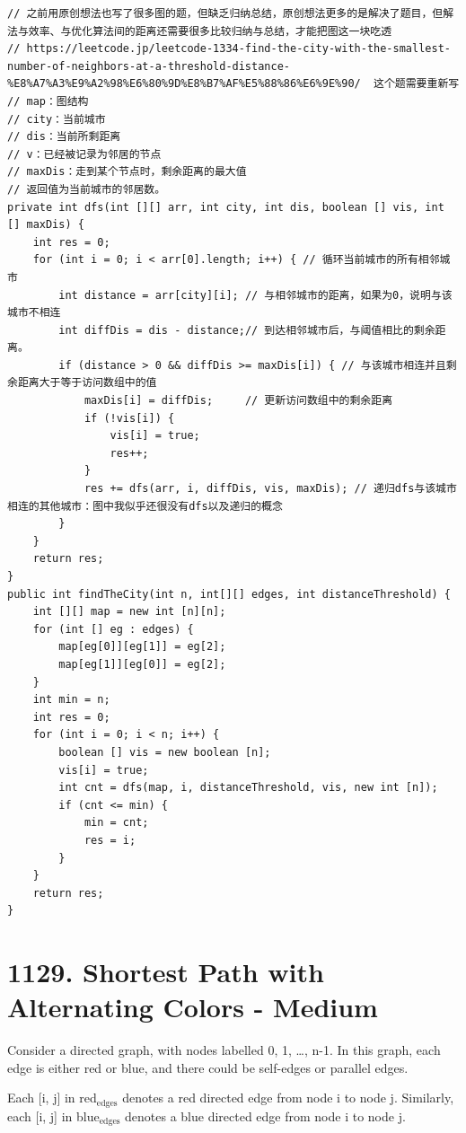 \documentclass[9pt, b5paaper]{book}
\begin{document}
\begin{verbatim}
// 之前用原创想法也写了很多图的题，但缺乏归纳总结，原创想法更多的是解决了题目，但解法与效率、与优化算法间的距离还需要很多比较归纳与总结，才能把图这一块吃透
// https://leetcode.jp/leetcode-1334-find-the-city-with-the-smallest-number-of-neighbors-at-a-threshold-distance-%E8%A7%A3%E9%A2%98%E6%80%9D%E8%B7%AF%E5%88%86%E6%9E%90/  这个题需要重新写
// map：图结构
// city：当前城市
// dis：当前所剩距离
// v：已经被记录为邻居的节点
// maxDis：走到某个节点时，剩余距离的最大值
// 返回值为当前城市的邻居数。
private int dfs(int [][] arr, int city, int dis, boolean [] vis, int [] maxDis) {
    int res = 0;
    for (int i = 0; i < arr[0].length; i++) { // 循环当前城市的所有相邻城市
        int distance = arr[city][i]; // 与相邻城市的距离，如果为0，说明与该城市不相连
        int diffDis = dis - distance;// 到达相邻城市后，与阈值相比的剩余距离。
        if (distance > 0 && diffDis >= maxDis[i]) { // 与该城市相连并且剩余距离大于等于访问数组中的值
            maxDis[i] = diffDis;     // 更新访问数组中的剩余距离   
            if (!vis[i]) {
                vis[i] = true;
                res++;
            }
            res += dfs(arr, i, diffDis, vis, maxDis); // 递归dfs与该城市相连的其他城市：图中我似乎还很没有dfs以及递归的概念
        }
    }
    return res;
}
public int findTheCity(int n, int[][] edges, int distanceThreshold) {
    int [][] map = new int [n][n];
    for (int [] eg : edges) {
        map[eg[0]][eg[1]] = eg[2];
        map[eg[1]][eg[0]] = eg[2];
    }
    int min = n;
    int res = 0;
    for (int i = 0; i < n; i++) {
        boolean [] vis = new boolean [n];
        vis[i] = true;
        int cnt = dfs(map, i, distanceThreshold, vis, new int [n]);
        if (cnt <= min) {
            min = cnt;
            res = i;
        }
    }
    return res;
}
\end{verbatim}

\section{1129. Shortest Path with Alternating Colors - Medium}
\label{sec-18-3}
Consider a directed graph, with nodes labelled 0, 1, \ldots{}, n-1.  In this graph, each edge is either red or blue, and there could be self-edges or parallel edges.

Each [i, j] in red$_{\text{edges}}$ denotes a red directed edge from node i to node j.  Similarly, each [i, j] in blue$_{\text{edges}}$ denotes a blue directed edge from node i to node j.
\end{document}
